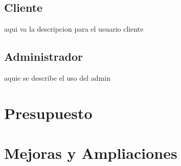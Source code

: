 \documentclass[a4paper]{article}
\begin{document}
        \subsection{Cliente}
    aqui va la descripcion para el usuario cliente
        \subsection{Administrador}
    aquie se describe el uso del admin

	\section{Presupuesto}

    \section{Mejoras y Ampliaciones}
    
    
    
    
\end{document}

